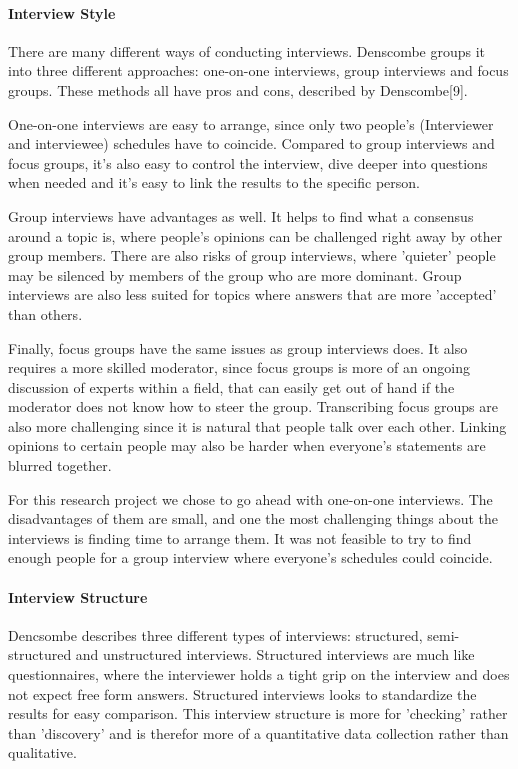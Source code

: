 \documentclass{article}
\begin{document}
\paragraph{Interview Style}
There are many different ways of conducting interviews. Denscombe groups it into
three different approaches: one-on-one interviews, group interviews and focus groups.
These methods all have pros and cons, described by Denscombe[9].

One-on-one interviews are easy to arrange, since
only two people's (Interviewer and interviewee) schedules have to coincide.
Compared to group interviews and focus groups, it's also easy to control the interview,
dive deeper into questions when needed and it's easy to link the results
to the specific person.

Group interviews have advantages as well. It helps to find what a consensus around
a topic is, where people's opinions can be challenged right away by other group members.
There are also risks of group interviews, where 'quieter' people may be silenced by
members of the group who are more dominant. Group interviews are also less suited
for topics where answers that are more 'accepted' than others.

Finally, focus groups have the same issues as group interviews does. It also
requires a more skilled moderator, since focus groups is more of an ongoing
discussion of experts within a field, that can easily get out of hand if the
moderator does not know how to steer the group.  Transcribing focus groups are also
more challenging since it is natural that people talk over each other. Linking opinions
to certain people may also be harder when everyone's statements are blurred together.

For this research project we chose to go ahead with one-on-one interviews.
The disadvantages of them are small, and one the most challenging things
about the interviews is finding time to arrange them. It was not feasible
to try to find enough people for a group interview where everyone's schedules
could coincide.

\paragraph{Interview Structure}
Dencsombe describes three different types of interviews: structured, semi-structured and
unstructured interviews. Structured interviews are much like questionnaires, where
the interviewer holds a tight grip on the interview and does not expect free form answers.
Structured interviews looks to standardize the results for easy comparison.
This interview structure is more for 'checking' rather than 'discovery' and is
therefor more of a quantitative data collection rather than qualitative.
\end{document}
